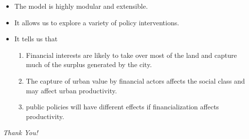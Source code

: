 \documentclass[hide notes=show/only]{beamer} %
\begin{document}
\begin{frame}{} 

\begin{itemize} \Large
\item The model is highly modular and extensible. 
\item It allows us to explore a variety of policy interventions. 
\item It tells us that 
\begin{enumerate}
    \item Financial interests are likely to take over most of the land and capture much of the surplus generated by the city.
    \item The capture of urban value by financial actors affects the social class and may affect urban productivity.
    \item public policies will have different effects if financialization affects productivity.
    \end{enumerate}
\end{itemize}
\end{frame}
\begin{frame}
  \centering \Large
  \emph{Thank You!}
\end{frame}
\end{document}
